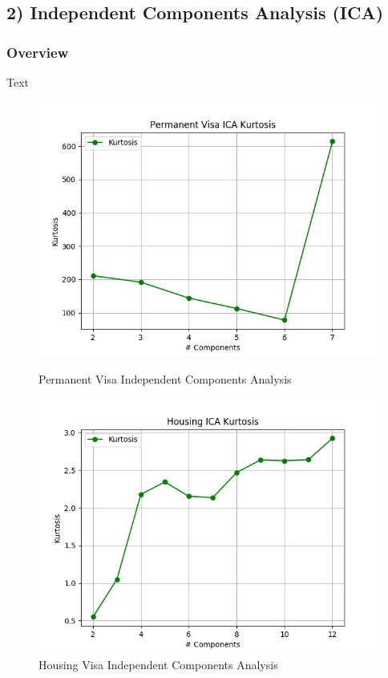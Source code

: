 \documentclass[h]{article}
\begin{document}
\subsection*{2) Independent Components Analysis (ICA)}  
\subsubsection*{Overview}
Text

 \begin{figure}[H]
      \includegraphics[width=1\textwidth,keepaspectratio]{permanent_visa_ica_kurtosis.jpg} 
      \caption*{Permanent Visa Independent Components Analysis } 
   \endminipage\hfill
      \includegraphics[width=1\textwidth,keepaspectratio]{housing_ica_kurtosis.jpg} 
      \caption*{Housing Visa Independent Components Analysis } 
   \endminipage\hfill
\end{figure}
\end{document}
